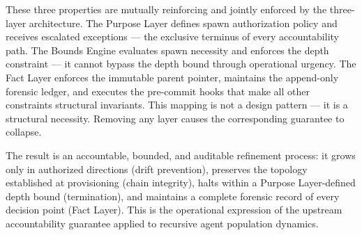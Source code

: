These three properties are mutually reinforcing and jointly enforced by the \bxthree three-layer architecture. The Purpose Layer defines spawn authorization policy and receives escalated exceptions — the exclusive terminus of every accountability path. The Bounds Engine evaluates spawn necessity and enforces the depth constraint — it cannot bypass the depth bound through operational urgency. The Fact Layer enforces the immutable parent pointer, maintains the append-only forensic ledger, and executes the pre-commit hooks that make all other constraints structural invariants. This mapping is not a design pattern — it is a structural necessity. Removing any layer causes the corresponding guarantee to collapse.

The result is an accountable, bounded, and auditable refinement process: it grows only in authorized directions (drift prevention), preserves the topology established at provisioning (chain integrity), halts within a Purpose Layer-defined depth bound (termination), and maintains a complete forensic record of every decision point (Fact Layer). This is the operational expression of the upstream \bxthree accountability guarantee applied to recursive agent population dynamics.